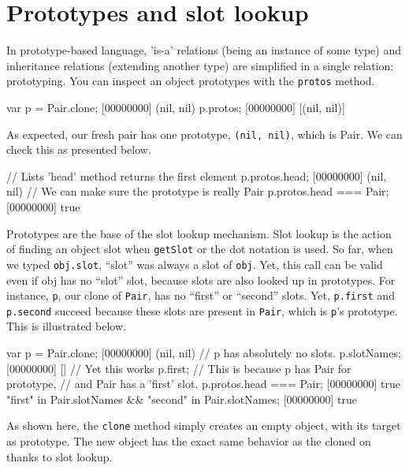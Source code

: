 \section{Prototypes and slot lookup}

In prototype-based language, 'is-a' relations (being an instance of
some type) and inheritance relations (extending another type) are
simplified in a single relation: prototyping. You can inspect an
object prototypes with the \lstinline{protos} method.

\begin{urbiscript}
var p = Pair.clone;
[00000000] (nil, nil)
p.protos;
[00000000] [(nil, nil)]
\end{urbiscript}

As expected, our fresh pair has one prototype, \lstinline|(nil, nil)|,
which is Pair. We can check this as presented below.

\begin{urbiscript}
// Lists 'head' method returns the first element
p.protos.head;
[00000000] (nil, nil)
// We can make sure the prototype is really Pair
p.protos.head === Pair;
[00000000] true
\end{urbiscript}

Prototypes are the base of the slot lookup mechanism. Slot lookup is
the action of finding an object slot when \lstinline{getSlot} or the dot
notation is used. So far, when we typed \lstinline|obj.slot|, ``slot''
was always a slot of \lstinline|obj|.
Yet, this call can be valid even if obj has
no ``slot'' slot, because slots are also looked up in prototypes. For
instance, \lstinline|p|, our clone of \lstinline|Pair|, has no
``first'' or ``second'' slots. Yet, \lstinline|p.first| and
\lstinline|p.second| succeed because these slots are present in
\lstinline|Pair|, which is \lstinline|p|'s prototype. This is
illustrated below.

\begin{urbiscript}
var p = Pair.clone;
[00000000] (nil, nil)
// p has absolutely no slots.
p.slotNames;
[00000000] []
// Yet this works
p.first;
// This is because p has Pair for prototype,
// and Pair has a 'first' slot.
p.protos.head === Pair;
[00000000] true
"first" in Pair.slotNames && "second" in Pair.slotNames;
[00000000] true
\end{urbiscript}

As shown here, the \lstinline{clone} method simply creates an empty
object, with its target as prototype. The new object has the exact
same behavior as the cloned on thanks to slot lookup.

